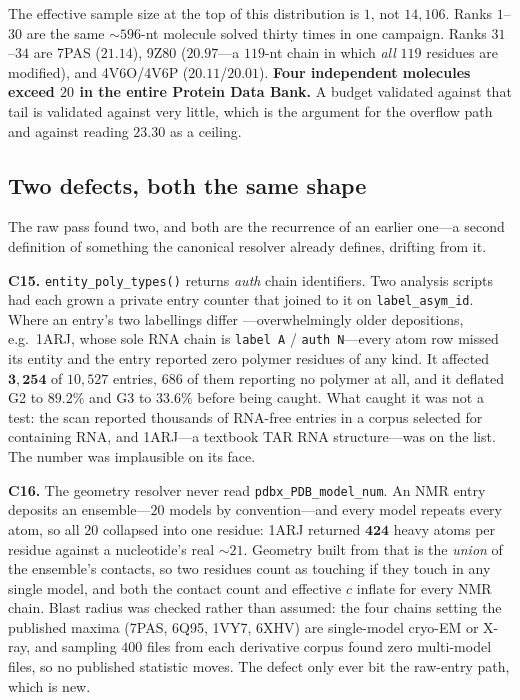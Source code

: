 \documentclass[11pt,a4paper]{article}
\begin{document}
The effective sample size at the top of this distribution is $1$, not
$14{,}106$. Ranks $1$--$30$ are the same ${\sim}596$-nt molecule solved thirty
times in one campaign. Ranks $31$--$34$ are 7PAS ($21.14$), 9Z80 ($20.97$---a
$119$-nt chain in which \emph{all} $119$ residues are modified), and 4V6O/4V6P
($20.11$/$20.01$). \textbf{Four independent molecules exceed $20$ in the entire
Protein Data Bank.} A budget validated against that tail is validated against
very little, which is the argument for the overflow path and against reading
$23.30$ as a ceiling.

\subsection{Two defects, both the same shape}

The raw pass found two, and both are the recurrence of an earlier one---a second
definition of something the canonical resolver already defines, drifting from it.

\textbf{C15.} \texttt{entity\_poly\_types()} returns \emph{auth} chain
identifiers. Two analysis scripts had each grown a private entry counter that
joined to it on \texttt{label\_asym\_id}. Where an entry's two labellings differ
---overwhelmingly older depositions, e.g.\ 1ARJ, whose sole RNA chain is
\texttt{label A} / \texttt{auth N}---every atom row missed its entity and the
entry reported zero polymer residues of any kind. It affected $\mathbf{3{,}254}$
of $10{,}527$ entries, $686$ of them reporting no polymer at all, and it
deflated G2 to $89.2\%$ and G3 to $33.6\%$ before being caught. What caught it
was not a test: the scan reported thousands of RNA-free entries in a corpus
selected for containing RNA, and 1ARJ---a textbook TAR RNA structure---was on
the list. The number was implausible on its face.

\textbf{C16.} The geometry resolver never read \texttt{pdbx\_PDB\_model\_num}.
An NMR entry deposits an ensemble---$20$ models by convention---and every model
repeats every atom, so all $20$ collapsed into one residue: 1ARJ returned
$\mathbf{424}$ heavy atoms per residue against a nucleotide's real ${\sim}21$.
Geometry built from that is the \emph{union} of the ensemble's contacts, so two
residues count as touching if they touch in any single model, and both the
contact count and effective $c$ inflate for every NMR chain. Blast radius was
checked rather than assumed: the four chains setting the published maxima (7PAS,
6Q95, 1VY7, 6XHV) are single-model cryo-EM or X-ray, and sampling $400$ files
from each derivative corpus found zero multi-model files, so no published
statistic moves. The defect only ever bit the raw-entry path, which is new.
\end{document}
